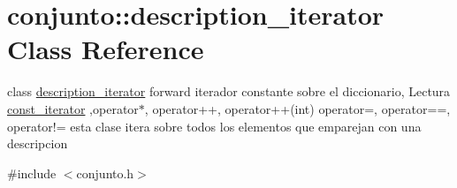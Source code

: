 \hypertarget{classconjunto_1_1description__iterator}{\section{conjunto\-:\-:description\-\_\-iterator Class Reference}
\label{classconjunto_1_1description__iterator}
}


class \hyperlink{classconjunto_1_1description__iterator}{description\-\_\-iterator} forward iterador constante sobre el diccionario, Lectura \hyperlink{classconjunto_1_1const__iterator}{const\-\_\-iterator} ,operator$\ast$, operator++, operator++(int) operator=, operator==, operator!= esta clase itera sobre todos los elementos que emparejan con una descripcion  




{\ttfamily \#include $<$conjunto.\-h$>$}

